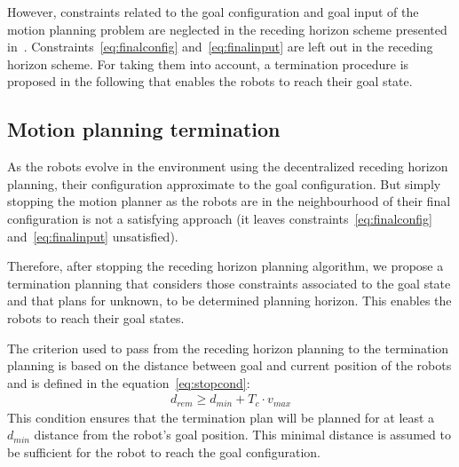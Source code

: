 \documentclass[eprint]{actapoly}
\begin{document}
However, constraints related to the goal configuration and goal input of the motion planning problem are
neglected in the receding horizon scheme presented in~\cite{Defoort2007a}.
Constraints~\ref{eq:finalconfig} and~\ref{eq:finalinput} are left out
in the receding horizon scheme.
For taking them into account, a termination procedure is proposed in the following that enables the robots to reach their goal state.



\subsection{Motion planning termination}



As the robots evolve in the environment using the decentralized receding horizon planning, their configuration approximate to the goal configuration.
But simply stopping the motion planner as the robots are in the neighbourhood 
of their final configuration is not a satisfying approach (it leaves 
constraints~\ref{eq:finalconfig} and~\ref{eq:finalinput} unsatisfied).


Therefore, after stopping the receding horizon planning algorithm, we propose a 
termination planning that considers those constraints associated to 
the goal state
and that plans for unknown, to be determined planning horizon. This enables
the robots to reach their goal states.


The criterion used to pass from the receding 
horizon planning to the termination planning is based on the distance between
goal and current position of the robots and is defined in the
equation~\ref{eq:stopcond}:
\begin{align}\label{eq:stopcond}
  d_{rem} \geq d_{min} + T_c \cdot v_{max}
\end{align}
This condition ensures that the termination plan will be planned for at least a 
$d_{min}$ distance from the robot's goal position.
This minimal distance is assumed to be sufficient for the robot to reach the 
goal configuration.
\end{document}

